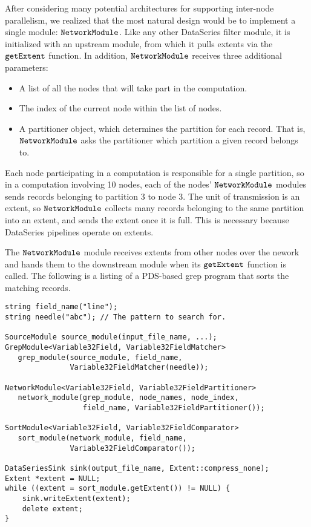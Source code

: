 \documentclass{acm_proc_article-sp}
\newenvironment{mylisting}
{\begin{list}{}{\setlength{\leftmargin}{1em}}\item\scriptsize\bfseries}
{\end{list}}
\begin{document}
After considering many potential architectures for supporting inter-node
parallelism, we realized that the most natural design would be to implement a
single module: $\tt NetworkModule$. Like any other DataSeries filter module, it is initialized with an upstream module, from which
it pulls extents via the $\tt getExtent$ function. In addition, $\tt
NetworkModule$ receives three additional parameters:
\begin{itemize}
  \item A list of all the nodes that will take part in the computation.
  \item The index of the current node within the list of nodes.
  \item A partitioner object, which determines the partition for each
  record. That is, $\tt NetworkModule$ asks the partitioner which partition a
  given record belongs to.
\end{itemize}

Each node participating in a computation is responsible for a single
partition, so in a computation involving 10 nodes, each of the nodes'
$\tt NetworkModule$ modules sends records belonging to partition 3 to node 3.
The unit of transmission is an extent, so $\tt NetworkModule$ collects many
records belonging to the same partition into an extent, and sends the extent once it is
full. This is necessary because DataSeries pipelines operate on extents.

The $\tt NetworkModule$ module receives extents from other nodes over the
nework and hands them to the downstream module when its $\tt getExtent$ function is called. The
following is a listing of a PDS-based grep program that sorts the matching
records.
\begin{mylisting}
\begin{verbatim}
string field_name("line");
string needle("abc"); // The pattern to search for.

SourceModule source_module(input_file_name, ...);
GrepModule<Variable32Field, Variable32FieldMatcher>
   grep_module(source_module, field_name,
               Variable32FieldMatcher(needle));

NetworkModule<Variable32Field, Variable32FieldPartitioner>
   network_module(grep_module, node_names, node_index,
                  field_name, Variable32FieldPartitioner());

SortModule<Variable32Field, Variable32FieldComparator>
   sort_module(network_module, field_name,
               Variable32FieldComparator());

DataSeriesSink sink(output_file_name, Extent::compress_none);
Extent *extent = NULL;
while ((extent = sort_module.getExtent()) != NULL) {
    sink.writeExtent(extent);
    delete extent;
}
\end{verbatim}
\end{mylisting}
\end{document}
